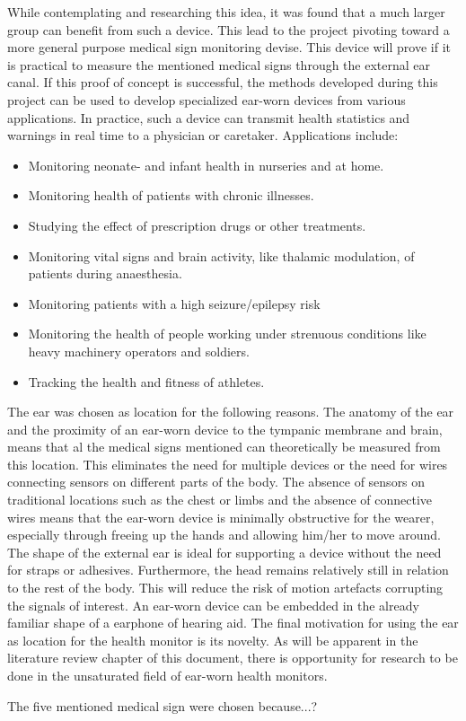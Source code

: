 \medskip

While contemplating and researching this idea, it was found that a much larger group can benefit from such a device. This lead to the project pivoting toward a more general purpose medical sign monitoring devise. This device will prove if it is practical to measure the mentioned medical signs through the external ear canal. If this proof of concept is successful, the methods developed during this project can be used to develop specialized ear-worn devices from various applications. In practice, such a device can transmit health statistics and warnings in real time to a physician or caretaker. Applications include:

\begin{itemize}
\item Monitoring neonate- and infant health in nurseries and at home.
\item Monitoring health of patients with chronic illnesses.
\item Studying the effect of prescription drugs or other treatments.
\item Monitoring vital signs and brain activity, like thalamic modulation, of patients during anaesthesia.
\item Monitoring patients with a high seizure/epilepsy risk
\item Monitoring the health of people working under strenuous conditions like heavy machinery operators and soldiers.
\item Tracking the health and fitness of athletes.
\end{itemize}

The ear was chosen as location for the following reasons. The anatomy of the ear and the proximity of an ear-worn device to the tympanic membrane and brain, means that al the medical signs mentioned can theoretically be measured from this location. This eliminates the need for multiple devices or the need for wires connecting sensors on different parts of the body. The absence of sensors on traditional locations such as the chest or limbs and the absence of connective wires means that the ear-worn device is minimally obstructive for the wearer, especially through freeing up the hands and allowing him/her to move around. The shape of the external ear is ideal for supporting a device without the need for straps or adhesives. Furthermore, the head remains relatively still in relation to the rest of the body. This will reduce the risk of motion artefacts corrupting the signals of interest. An ear-worn device can be embedded in the already familiar shape of a earphone of hearing aid. The final motivation for using the ear as location for the health monitor is its novelty. As will be apparent in the literature review chapter of this document, there is opportunity for research to be done in the unsaturated field of ear-worn health monitors.

\medskip
The five mentioned medical sign were chosen because...?

